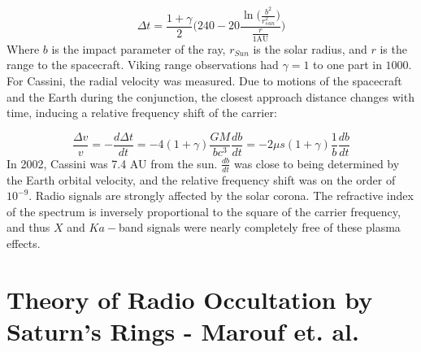 \documentclass{article}
\theoremstyle{mystyle}
\begin{document}
\begin{equation}
\Delta t = \frac{1+\gamma}{2}\bigg(240 - 20\frac{\ln\bigg(\frac{b^2}{r_{sun}^2}\bigg)}{\frac{r}{1\textrm{AU}}}\bigg)
\end{equation}
Where $b$ is the impact parameter of the ray, $r_{Sun}$ is the solar radius, and $r$ is the range to the spacecraft. Viking range observations had $\gamma=1$ to one part in $1000$. For Cassini, the radial velocity was measured. Due to motions of the spacecraft and the Earth during the conjunction, the closest approach distance changes with time, inducing a relative frequency shift of the carrier:

\begin{equation}
\frac{\Delta v}{v} = -\frac{d\Delta t}{dt} = -4(1+\gamma)\frac{GM}{bc^3}\frac{db}{dt} = -2\mu s(1+\gamma)\frac{1}{b}\frac{db}{dt}
\end{equation}
In 2002, Cassini was 7.4 AU from the sun. $\frac{db}{dt}$ was close to being determined by the Earth orbital velocity, and the relative frequency shift was on the order of $10^{-9}$. Radio signals are strongly affected by the solar corona. The refractive index of the spectrum is inversely proportional to the square of the carrier frequency, and thus $X$ and $Ka-$band signals were nearly completely free of these plasma effects. 
%
\section{Theory of Radio Occultation by Saturn's Rings - Marouf et. al.}
%
\end{document}
